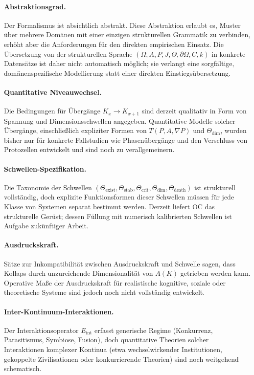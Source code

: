 \paragraph{Abstraktionsgrad.}
Der Formalismus ist absichtlich abstrakt. Diese Abstraktion erlaubt es,
Muster über mehrere Domänen mit einer einzigen strukturellen Grammatik zu
verbinden, erhöht aber die Anforderungen für den direkten empirischen Einsatz.
Die Übersetzung von der strukturellen Sprache
\((\Omega,A,P,J,\Theta,\partial\Omega,C,k)\)
in konkrete Datensätze ist daher nicht automatisch möglich; sie verlangt eine
sorgfältige, domänenspezifische Modellierung statt einer direkten
Einstiegsübersetzung.

\paragraph{Quantitative Niveauwechsel.}
Die Bedingungen für Übergänge \(K_x \to K_{x+1}\) sind derzeit qualitativ in
Form von Spannung und Dimensionsschwellen angegeben.
Quantitative Modelle solcher Übergänge, einschließlich expliziter Formen von
\(T(P,A,\nabla P)\) und \(\Theta_{\mathrm{dim}}\), wurden bisher nur für
konkrete Fallstudien wie Phasenübergänge und den Verschluss von Protozellen
entwickelt und sind noch zu verallgemeinern.

\paragraph{Schwellen-Spezifikation.}
Die Taxonomie der Schwellen
\((\Theta_{\mathrm{exist}}, \Theta_{\mathrm{stab}}, \Theta_{\mathrm{crit}}, \Theta_{\mathrm{dim}}, \Theta_{\mathrm{death}})\)
ist strukturell vollständig, doch explizite Funktionsformen dieser
Schwellen müssen für jede Klasse von Systemen separat bestimmt werden.
Derzeit liefert OC das strukturelle Gerüst; dessen Füllung mit numerisch
kalibrierten Schwellen ist Aufgabe zukünftiger Arbeit.

\paragraph{Ausdruckskraft.}
Sätze zur Inkompatibilität zwischen Ausdruckskraft und Schwelle sagen, dass
Kollaps durch unzureichende Dimensionalität von \(A(K)\) getrieben werden kann.
Operative Maße der Ausdruckskraft für realistische kognitive, soziale oder theoretische Systeme sind jedoch noch nicht vollständig entwickelt.

\paragraph{Inter-Kontinuum-Interaktionen.}
Der Interaktionsoperator \(E_{\mathrm{int}}\) erfasst generische Regime
(Konkurrenz, Parasitismus, Symbiose, Fusion), doch quantitative Theorien solcher
Interaktionen komplexer Kontinua (etwa wechselwirkender Institutionen,
gekoppelte Zivilisationen oder konkurrierende Theorien) sind noch weitgehend
schematisch.

